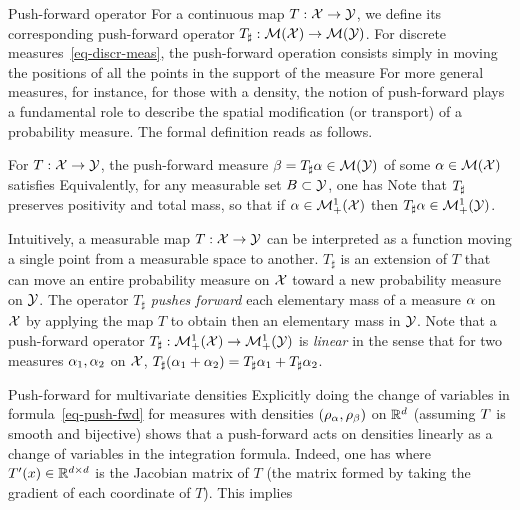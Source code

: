 \begin{rem2}{Push-forward operator}\label{rem-push-f}
For a continuous map $T : \mathcal{X} \rightarrow \mathcal{Y}$, we define its corresponding push-forward operator $T_\sharp : \mathcal{M}(\mathcal{X}) \rightarrow \mathcal{M}(\mathcal{Y})$.
%
For discrete measures~\eqref{eq-discr-meas}, the push-forward operation consists simply in moving the positions of all the points in the support of the measure
For more general measures, for instance, for those with a density, the notion of push-forward plays a fundamental role to describe the spatial modification (or transport) of a probability measure. The formal definition reads as follows.

\begin{defn}\label{defn-pushfwd}
For $T : \mathcal{X} \rightarrow \mathcal{Y}$, the push-forward measure $\beta = T_\sharp \alpha \in \mathcal{M}(\mathcal{Y})$ of some $\alpha \in \mathcal{M}(\mathcal{X})$ satisfies
Equivalently, for any measurable set $B \subset \mathcal{Y}$, one has
Note that $T_\sharp$ preserves positivity and total mass, so that if $\alpha \in \mathcal{M}_+^1(\mathcal{X})$ then $T_\sharp \alpha \in \mathcal{M}_+^1(\mathcal{Y})$.
\end{defn}

Intuitively, a measurable map $T: \mathcal{X}\rightarrow \mathcal{Y}$ can be interpreted as a function moving a single point from a measurable space to another. $T_\sharp$ is an extension of $T$ that can move an entire probability measure on $\mathcal{X}$ toward a new probability measure on $\mathcal{Y}$. The operator $T_\sharp$ \emph{pushes forward} each elementary mass of a measure $\alpha$ on $\mathcal{X}$ by applying the map $T$ to obtain then an elementary mass in $\mathcal{Y}$.  Note that a push-forward operator $T_\sharp : \mathcal{M}_+^1(\mathcal{X}) \rightarrow \mathcal{M}_+^1(\mathcal{Y})$ is \emph{linear} in the sense that for two measures $\alpha_1,\alpha_2$ on $\mathcal{X}$, $T_\sharp(\alpha_1+\alpha_2)=T_\sharp\alpha_1+ T_\sharp\alpha_2$.
\end{rem2}

\begin{rem2}{Push-forward for multivariate densities}
Explicitly doing the change of variables in formula~\eqref{eq-push-fwd} for measures with densities $(\rho_{\alpha},\rho_{\beta})$ on $\mathbb{R}^d$ (assuming $T$ is smooth and bijective) shows that a push-forward acts on densities linearly as a change of variables in the integration formula. Indeed, one has
where $T'(x) \in \mathbb{R}^{d \times d}$ is the Jacobian matrix of $T$ (the matrix formed by taking the gradient of each coordinate of $T$).
This implies
\end{rem2}


